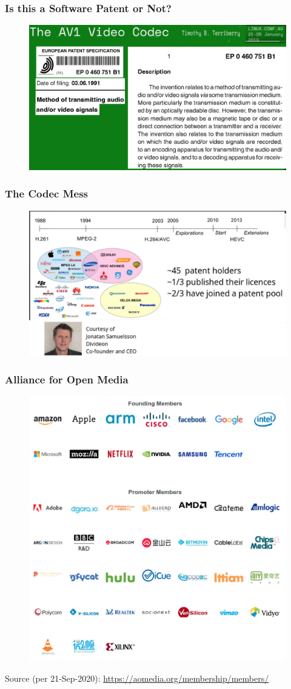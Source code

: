 \documentclass[aspectratio=169, xcolor=table, notheorems, hyperref={pdfpagelabels=false}]{beamer}
\begin{document}
\begin{frame}
\frametitle{Is this a Software Patent or Not?}
\begin{figure}
\includegraphics[width=0.75\linewidth]{os01-avw}
\end{figure}
\end{frame}

\begin{frame}
\frametitle{The Codec Mess}
\begin{figure}
\includegraphics[width=0.75\linewidth]{os01-avx}
\end{figure}
\end{frame}

\begin{frame}
\frametitle{Alliance for Open Media}
\begin{figure}
\includegraphics[width=0.40\linewidth]{os01-avy}
\end{figure}
{\small Source (per 21-Sep-2020): \url{https://aomedia.org/membership/members/}}
\end{frame}
\end{document}
